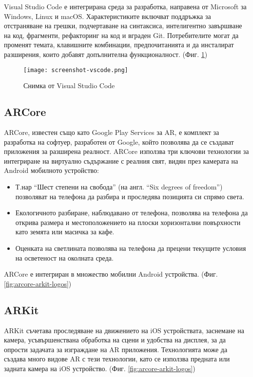 Visual Studio Code е интегрирана среда за разработка, направена от Microsoft за Windows, Linux и macOS. Характеристиките включват поддръжка за отстраняване на грешки, подчертаване на синтаксиса, интелигентно завършване на код, фрагменти, рефакторинг на код и вграден Git. Потребителите могат да променят темата, клавишните комбинации, предпочитанията и да инсталират разширения, които добавят допълнителна функционалност. (Фиг. \ref{fig:screenshot-vscode})

\begin{figure}[H]
    \texttt{[image: screenshot-vscode.png]}
    \centering
    \caption{Снимка от Visual Studio Code}
    \label{fig:screenshot-vscode}
\end{figure}

\subsection{ARCore}
ARCore, известен също като Google Play Services за AR, е комплект за разработка на софтуер, разработен от Google, който позволява да се създават приложения за разширена реалност. ARCore използва три ключови технологии за интегриране на виртуално съдържание с реалния свят, видян през камерата на Android мобилното устройство:

\begin{itemize}
    \item Т.нар ``Шест степени на свобода'' (на англ. ``Six degrees of freedom'') позволяват на телефона да разбира и проследява позицията си спрямо света.
    \item Екологичното разбиране, наблюдавано от телефона, позволява на телефона да открива размера и местоположението на плоски хоризонтални повърхности като земята или масичка за кафе.
    \item Оценката на светлината позволява на телефона да прецени текущите условия на осветеност на околната среда.
\end{itemize}

ARCore е интегриран в множество мобилни Android устройства. (Фиг. \ref{fig:arcore-arkit-logos})

\subsection{ARKit}
ARKit съчетава проследяване на движението на iOS устройствата, заснемане на камера, усъвършенствана обработка на сцени и удобства на дисплея, за да опрости задачата за изграждане на AR приложения. Технологията може да създава много видове AR с тези технологии, като се използва предната или задната камера на iOS устройство. (Фиг. \ref{fig:arcore-arkit-logos})


